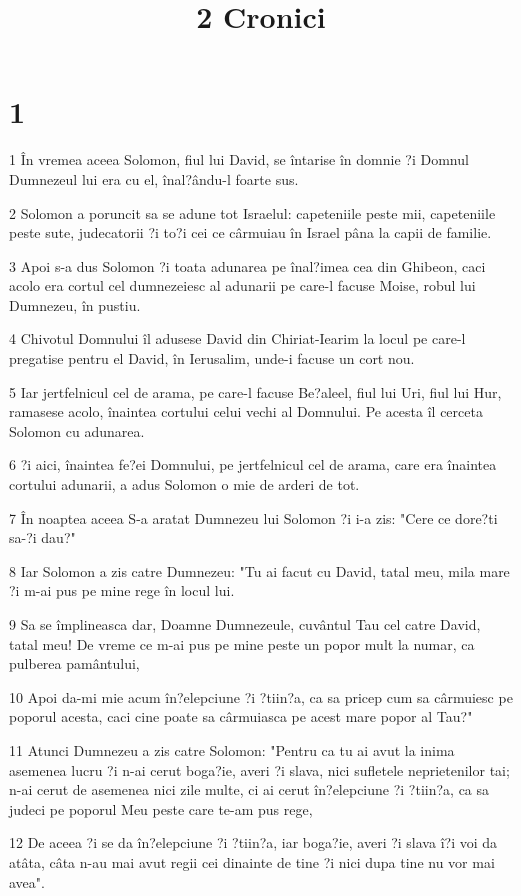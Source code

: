 

\title{2 Cronici}


\chapter{1}

\par 1 În vremea aceea Solomon, fiul lui David, se întarise în domnie ?i Domnul Dumnezeul lui era cu el, înal?ându-l foarte sus.
\par 2 Solomon a poruncit sa se adune tot Israelul: capeteniile peste mii, capeteniile peste sute, judecatorii ?i to?i cei ce cârmuiau în Israel pâna la capii de familie.
\par 3 Apoi s-a dus Solomon ?i toata adunarea pe înal?imea cea din Ghibeon, caci acolo era cortul cel dumnezeiesc al adunarii pe care-l facuse Moise, robul lui Dumnezeu, în pustiu.
\par 4 Chivotul Domnului îl adusese David din Chiriat-Iearim la locul pe care-l pregatise pentru el David, în Ierusalim, unde-i facuse un cort nou.
\par 5 Iar jertfelnicul cel de arama, pe care-l facuse Be?aleel, fiul lui Uri, fiul lui Hur, ramasese acolo, înaintea cortului celui vechi al Domnului. Pe acesta îl cerceta Solomon cu adunarea.
\par 6 ?i aici, înaintea fe?ei Domnului, pe jertfelnicul cel de arama, care era înaintea cortului adunarii, a adus Solomon o mie de arderi de tot.
\par 7 În noaptea aceea S-a aratat Dumnezeu lui Solomon ?i i-a zis: "Cere ce dore?ti sa-?i dau?"
\par 8 Iar Solomon a zis catre Dumnezeu: "Tu ai facut cu David, tatal meu, mila mare ?i m-ai pus pe mine rege în locul lui.
\par 9 Sa se împlineasca dar, Doamne Dumnezeule, cuvântul Tau cel catre David, tatal meu! De vreme ce m-ai pus pe mine peste un popor mult la numar, ca pulberea pamântului,
\par 10 Apoi da-mi mie acum în?elepciune ?i ?tiin?a, ca sa pricep cum sa cârmuiesc pe poporul acesta, caci cine poate sa cârmuiasca pe acest mare popor al Tau?"
\par 11 Atunci Dumnezeu a zis catre Solomon: "Pentru ca tu ai avut la inima asemenea lucru ?i n-ai cerut boga?ie, averi ?i slava, nici sufletele neprietenilor tai; n-ai cerut de asemenea nici zile multe, ci ai cerut în?elepciune ?i ?tiin?a, ca sa judeci pe poporul Meu peste care te-am pus rege,
\par 12 De aceea ?i se da în?elepciune ?i ?tiin?a, iar boga?ie, averi ?i slava î?i voi da atâta, câta n-au mai avut regii cei dinainte de tine ?i nici dupa tine nu vor mai avea".
